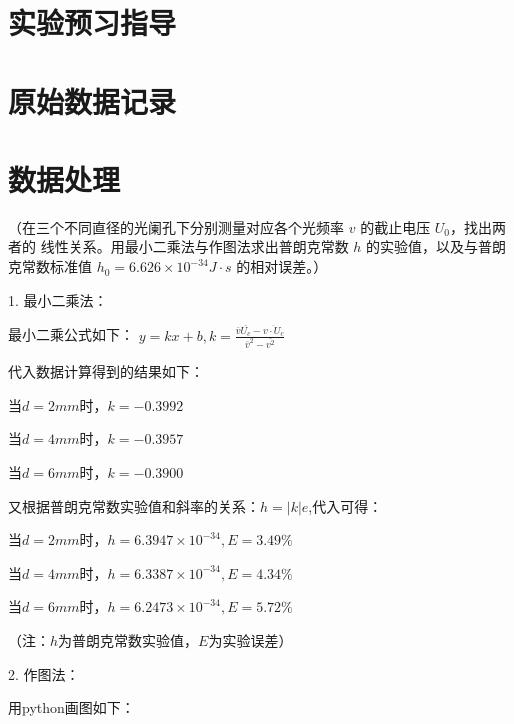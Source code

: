 \documentclass[signature=data]{physicsreport}
\begin{document}
\maketitle

\section{实验预习指导}
\newpage

\section{原始数据记录}
\makeatletter
{}
\makeatother

\newpage

\section{数据处理}

（在三个不同直径的光阑孔下分别测量对应各个光频率 $v$ 的截止电压 $U_0$，找出两者的
线性关系。用最小二乘法与作图法求出普朗克常数 $h$ 的实验值，以及与普朗克常数标准值
$h_0 = 6.626\times 10^{-34}J \cdot s$ 的相对误差。）

1. 最小二乘法：

最小二乘公式如下：
$y=kx+b,k=\frac{\bar{v}\overline{U_c}-\overline{v \cdot U_c}}{\bar{v}^2-\bar{v^2}}$


代入数据计算得到的结果如下：

当$d=2mm$时，$k=-0.3992$

当$d=4mm$时，$k=-0.3957$

当$d=6mm$时，$k=-0.3900$

又根据普朗克常数实验值和斜率的关系：$h=|k|e$,代入可得：

当$d=2mm$时，$h=6.3947\times10^{-34},E=3.49\%$

当$d=4mm$时，$h=6.3387\times10^{-34},E=4.34\%$

当$d=6mm$时，$h=6.2473\times10^{-34},E=5.72\%$

（注：$h$为普朗克常数实验值，$E$为实验误差）

2. 作图法：

用python画图如下：
\end{document}
